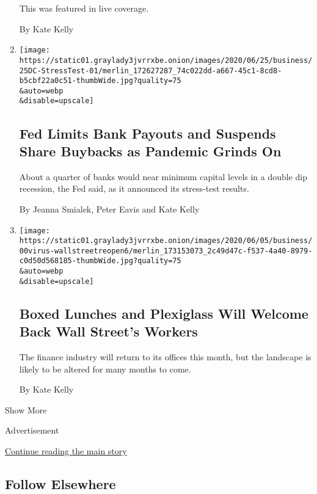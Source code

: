 \begin{enumerate}
  This was featured in live coverage.

  By Kate Kelly
\item
  \href{/2020/06/25/business/economy/fed-dividend-buyback-limits.html}{}

  \texttt{[image: https://static01.graylady3jvrrxbe.onion/images/2020/06/25/business/25DC-StressTest-01/merlin\_172627287\_74c022dd-a667-45c1-8cd8-b5cbf22a0c51-thumbWide.jpg?quality=75\\\&auto=webp\\\&disable=upscale]}

  \hypertarget{fed-limits-bank-payouts-and-suspends-share-buybacks-as-pandemic-grinds-on}{%
  \subsection{Fed Limits Bank Payouts and Suspends Share Buybacks as
  Pandemic Grinds
  On}\label{fed-limits-bank-payouts-and-suspends-share-buybacks-as-pandemic-grinds-on}}

  About a quarter of banks would near minimum capital levels in a double
  dip recession, the Fed said, as it announced its stress-test results.

  By Jeanna Smialek, Peter Eavis and Kate Kelly
\item
  \href{/2020/06/08/business/wall-street-virus-reopen.html}{}

  \texttt{[image: https://static01.graylady3jvrrxbe.onion/images/2020/06/05/business/00virus-wallstreetreopen6/merlin\_173153073\_2c49d47c-f537-4a40-8979-c0d50d568185-thumbWide.jpg?quality=75\\\&auto=webp\\\&disable=upscale]}

  \hypertarget{boxed-lunches-and-plexiglass-will-welcome-back-wall-streets-workers}{%
  \subsection{Boxed Lunches and Plexiglass Will Welcome Back Wall
  Street's
  Workers}\label{boxed-lunches-and-plexiglass-will-welcome-back-wall-streets-workers}}

  The finance industry will return to its offices this month, but the
  landscape is likely to be altered for many months to come.

  By Kate Kelly
\end{enumerate}

Show More

Advertisement

\protect\hyperlink{after-mid2}{Continue reading the main story}

\hypertarget{follow-elsewhere}{%
\subsection{Follow Elsewhere}\label{follow-elsewhere}}

